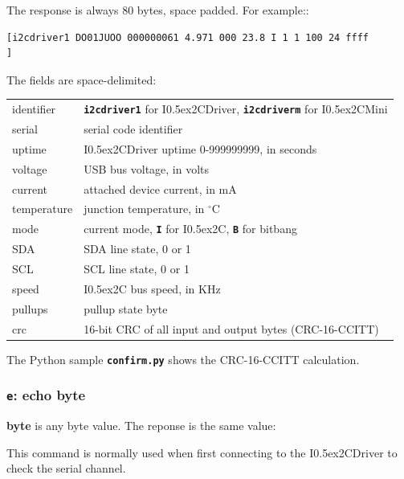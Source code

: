 \documentclass{article}
\newcommand{\two}{\raise0.5ex\hbox{\footnotesize{2}}}
\newcommand{\iic}{I\two{}C}
\newcommand{\iicdriver}{I\two{}CDriver}
\newcommand{\iicmini}{I\two{}CMini}
\newcommand{\degc}{$^{\circ}$C}
\newcommand{\mach}[1]{\texttt{\textbf{#1}}}
\newcommand{\gap}{\vspace{10pt}}
\begin{document}
The response is always 80 bytes, space padded. For example::

\begin{lstlisting}
[i2cdriver1 DO01JUOO 000000061 4.971 000 23.8 I 1 1 100 24 ffff                ]
\end{lstlisting}

The fields are space-delimited:

\gap\begin{tabular}{ll}
\hline
identifier     & \mach{i2cdriver1} for \iicdriver{}, \mach{i2cdriverm} for \iicmini{} \\
serial         & serial code identifier \\
uptime         & \iicdriver{} uptime 0-999999999, in seconds \\
voltage        & USB bus voltage, in volts \\
current        & attached device current, in mA \\
temperature    & junction temperature, in \degc \\
mode           & current mode, \mach{I} for \iic{}, \mach{B} for bitbang \\
SDA            & SDA line state, 0 or 1 \\
SCL            & SCL line state, 0 or 1 \\
speed          & \iic{} bus speed, in KHz \index{speed}\\
pullups        & pullup state byte \\
crc            & 16-bit CRC of all input and output bytes (CRC-16-CCITT) \index{CRC} \\
\hline\end{tabular}\gap

The Python sample \mach{confirm.py} shows the CRC-16-CCITT calculation.

\subsubsection{\mach{e}: echo byte}

\byteseq{
  \bitbox{8}{\mach{e} (0x65)}\\
  \bitbox{8}{byte}\\
}

\textbf{byte} is any byte value.  The reponse is the same value:


This command is normally used when first connecting to the \iicdriver{} to check the serial channel.
\end{document}
